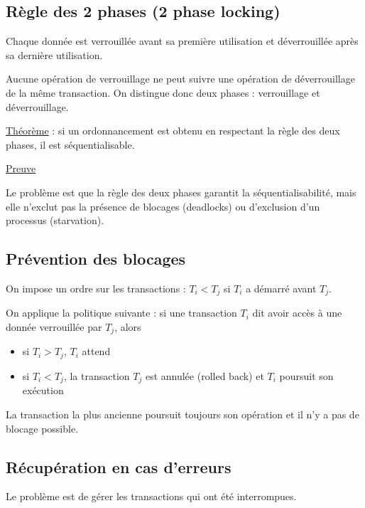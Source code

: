 		\subsection{Règle des 2 phases (2 phase locking)}
		
		Chaque donnée est verrouillée avant sa première utilisation et déverrouillée après sa dernière utilisation.
		
		Aucune opération de verrouillage ne peut suivre une opération de déverrouillage de la même transaction. On distingue donc deux phases : verrouillage et déverrouillage.
		
		\underline{Théorème} : si un ordonnancement est obtenu en respectant la règle des deux phases, il est séquentialisable.
		\pagebreak
		
		\underline{Preuve}
		
		
		Le problème est que la règle des deux phases garantit la séquentialisabilité, mais elle n'exclut pas la présence de blocages (deadlocks) ou d'exclusion d'un processus (starvation).
		
		
		
		\subsection{Prévention des blocages}
		
		On impose un ordre sur les transactions : $T_i < T_j$ si $T_i$ a démarré avant $T_j$.
		
		On applique la politique suivante : si une transaction $T_i$ dit avoir accès à une donnée verrouillée par $T_j$, alors
		
		\begin{itemize}
			\item si $T_i > T_j$, $T_i$ attend
			\item si $T_i < T_j$, la transaction $T_j$ est annulée (rolled back) et $T_i$ poursuit son exécution
		\end{itemize}
		
		La transaction la plus ancienne poursuit toujours son opération et il n'y a pas de blocage possible.
		
		\subsection{Récupération en cas d'erreurs}		
		
		 Le problème est de gérer les transactions qui ont été interrompues.
		
